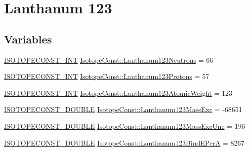\hypertarget{group___isotope_const-_lanthanum-_la123}{}\section{Lanthanum 123}
\label{group___isotope_const-_lanthanum-_la123}
\subsection*{Variables}
\begin{DoxyCompactItemize}
\item 
\mbox{\hyperlink{group___isotope_const-_macros_ga5f18360b3e99483a35c32d789e62621c}{I\+S\+O\+T\+O\+P\+E\+C\+O\+N\+S\+T\+\_\+\+I\+NT}} \mbox{\hyperlink{group___isotope_const-_lanthanum-_la123_ga98fe38e3270accfac4d26f96b67f91fa}{Isotope\+Const\+::\+Lanthanum123\+Neutrons}} = 66
\item 
\mbox{\hyperlink{group___isotope_const-_macros_ga5f18360b3e99483a35c32d789e62621c}{I\+S\+O\+T\+O\+P\+E\+C\+O\+N\+S\+T\+\_\+\+I\+NT}} \mbox{\hyperlink{group___isotope_const-_lanthanum-_la123_ga5748603213441888f0bad3e762694cc4}{Isotope\+Const\+::\+Lanthanum123\+Protons}} = 57
\item 
\mbox{\hyperlink{group___isotope_const-_macros_ga5f18360b3e99483a35c32d789e62621c}{I\+S\+O\+T\+O\+P\+E\+C\+O\+N\+S\+T\+\_\+\+I\+NT}} \mbox{\hyperlink{group___isotope_const-_lanthanum-_la123_ga912e6fc90d70a560f82418c638e8a8fa}{Isotope\+Const\+::\+Lanthanum123\+Atomic\+Weight}} = 123
\item 
\mbox{\hyperlink{group___isotope_const-_macros_ga8f45a7272ce02c0b4c65c44636ed719a}{I\+S\+O\+T\+O\+P\+E\+C\+O\+N\+S\+T\+\_\+\+D\+O\+U\+B\+LE}} \mbox{\hyperlink{group___isotope_const-_lanthanum-_la123_ga4eef5f4651cf2ff754958fcb6c2a86ab}{Isotope\+Const\+::\+Lanthanum123\+Mass\+Exc}} = -\/68651
\item 
\mbox{\hyperlink{group___isotope_const-_macros_ga8f45a7272ce02c0b4c65c44636ed719a}{I\+S\+O\+T\+O\+P\+E\+C\+O\+N\+S\+T\+\_\+\+D\+O\+U\+B\+LE}} \mbox{\hyperlink{group___isotope_const-_lanthanum-_la123_ga6e8d9d4030473f8e2b41b26ff5dfd35e}{Isotope\+Const\+::\+Lanthanum123\+Mass\+Exc\+Unc}} = 196
\item 
\mbox{\hyperlink{group___isotope_const-_macros_ga8f45a7272ce02c0b4c65c44636ed719a}{I\+S\+O\+T\+O\+P\+E\+C\+O\+N\+S\+T\+\_\+\+D\+O\+U\+B\+LE}} \mbox{\hyperlink{group___isotope_const-_lanthanum-_la123_ga9efcb63af27f145990ab32b3ca9a45c2}{Isotope\+Const\+::\+Lanthanum123\+Bind\+E\+PerA}} = 8267
\item 

\end{DoxyCompactItemize}
